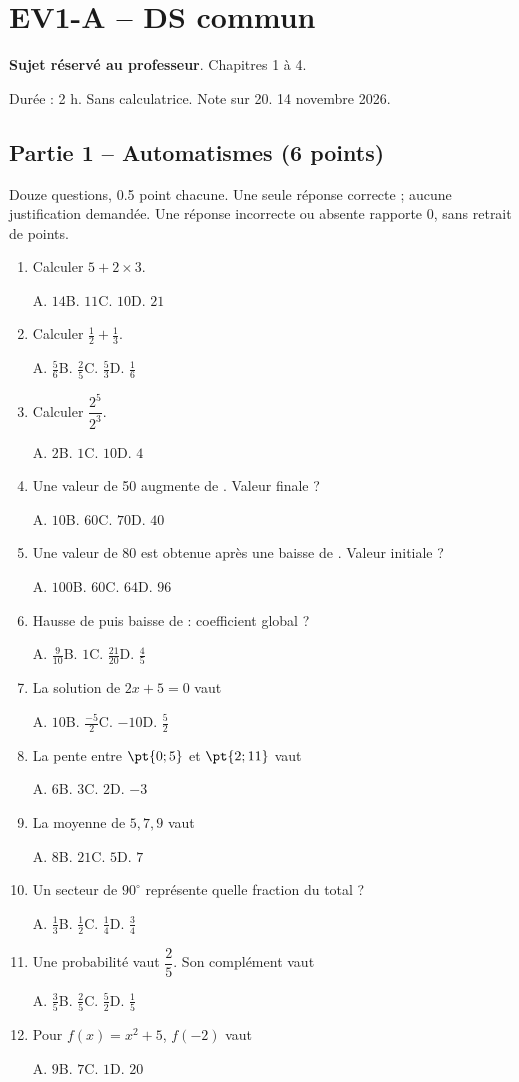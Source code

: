 \mxnewpage\section*{EV1-A -- DS commun}\label{EV1-A}
\textbf{Sujet réservé au professeur}. Chapitres 1 à 4.\par Durée : 2 h. Sans calculatrice. Note sur 20. 14 novembre 2026.
\subsection*{Partie 1 -- Automatismes (6 points)}
Douze questions, \num{0,5} point chacune. Une seule réponse correcte ; aucune justification demandée. Une réponse incorrecte ou absente rapporte 0, sans retrait de points.
\begin{enumerate}
\item Calculer $5+2\times3$.\par A. $14$\quad B. $11$\quad C. $10$\quad D. $21$
\item Calculer $\frac12+\frac13$.\par A. $\frac{5}{6}$\quad B. $\frac{2}{5}$\quad C. $\frac{5}{3}$\quad D. $\frac{1}{6}$
\item Calculer $\dfrac{2^5}{2^{3}}$.\par A. $2$\quad B. $1$\quad C. $10$\quad D. $4$
\item Une valeur de 50 augmente de . Valeur finale ?\par A. $10$\quad B. $60$\quad C. $70$\quad D. $40$
\item Une valeur de 80 est obtenue après une baisse de . Valeur initiale ?\par A. $100$\quad B. $60$\quad C. $64$\quad D. $96$
\item Hausse de  puis baisse de  : coefficient global ?\par A. $\frac{9}{10}$\quad B. $1$\quad C. $\frac{21}{20}$\quad D. $\frac{4}{5}$
\item La solution de $2x+5=0$ vaut\par A. $10$\quad B. $\frac{-5}{2}$\quad C. $-10$\quad D. $\frac{5}{2}$
\item La pente entre $\pt{0;5}$ et $\pt{2;11}$ vaut\par A. $6$\quad B. $3$\quad C. $2$\quad D. $-3$
\item La moyenne de $5, 7, 9$ vaut\par A. $8$\quad B. $21$\quad C. $5$\quad D. $7$
\item Un secteur de $90^\circ$ représente quelle fraction du total ?\par A. $\frac{1}{3}$\quad B. $\frac{1}{2}$\quad C. $\frac{1}{4}$\quad D. $\frac{3}{4}$
\item Une probabilité vaut $\dfrac{2}{5}$. Son complément vaut\par A. $\frac{3}{5}$\quad B. $\frac{2}{5}$\quad C. $\frac{5}{2}$\quad D. $\frac{1}{5}$
\item Pour $f(x)=x^2+5$, $f(-2)$ vaut\par A. $9$\quad B. $7$\quad C. $1$\quad D. $20$
\end{enumerate}
